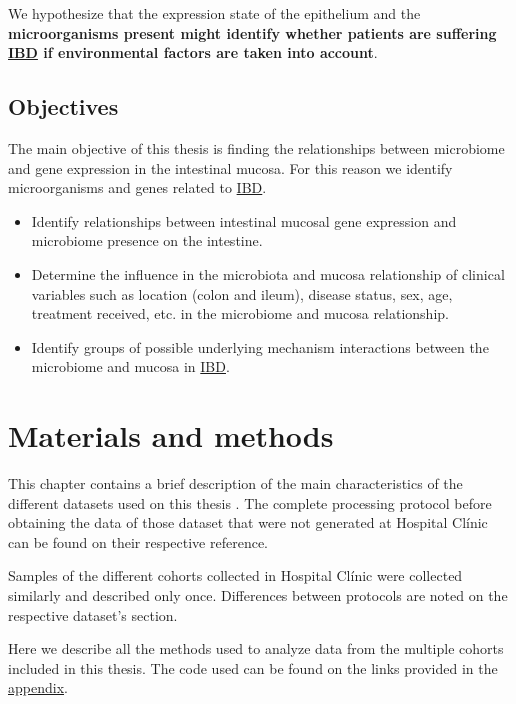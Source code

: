 \documentclass[
  12pt,
  a4paper,
  twoside,
  openright]{book}
\begin{document}
We hypothesize that the expression state of the epithelium and the \textbf{microorganisms present might identify whether patients are suffering \protect\hyperlink{acronyms_IBD}{IBD} if environmental factors are taken into account}.

\hypertarget{objectives}{%
\section{Objectives}\label{objectives}}

The main objective of this thesis is finding the relationships between microbiome and gene expression in the intestinal mucosa. For this reason we identify microorganisms and genes related to \protect\hyperlink{acronyms_IBD}{IBD}.

\begin{itemize}
\item
  Identify relationships between intestinal mucosal gene expression and microbiome presence on the intestine.
\item
  Determine the influence in the microbiota and mucosa relationship of clinical variables such as location (colon and ileum), disease status, sex, age, treatment received, etc. in the microbiome and mucosa relationship.
\item
  Identify groups of possible underlying mechanism interactions between the microbiome and mucosa in \protect\hyperlink{acronyms_IBD}{IBD}.
\end{itemize}

\hypertarget{materials-and-methods}{%
\chapter{Materials and methods}\label{materials-and-methods}}

This chapter contains a brief description of the main characteristics of the different datasets used on this thesis .
The complete processing protocol before obtaining the data of those dataset that were not generated at Hospital Clínic can be found on their respective reference.

Samples of the different cohorts collected in Hospital Clínic were collected similarly and described only once.
Differences between protocols are noted on the respective dataset's section.

Here we describe all the methods used to analyze data from the multiple cohorts included in this thesis.
The code used can be found on the links provided in the \protect\hyperlink{software}{appendix}.
\end{document}
